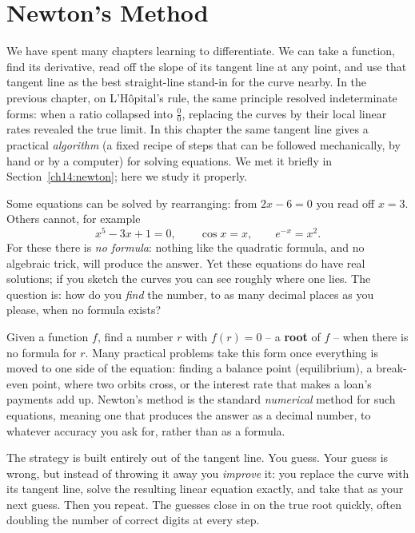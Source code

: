 \chapter{Newton's Method}

We have spent many chapters learning to differentiate. We can take a function,
find its derivative, read off the slope of its tangent line at any point, and use
that tangent line as the best straight-line stand-in for the curve nearby. In the
previous chapter, on L'H\^opital's rule, the same principle resolved
indeterminate forms: when a ratio collapsed into $\tfrac{0}{0}$, replacing the
curves by their local linear rates revealed the true limit. In this chapter the
same tangent line gives a practical \emph{algorithm} (a fixed recipe of steps that
can be followed mechanically, by hand or by a computer) for solving equations. We
met it briefly in Section~\ref{ch14:newton}; here we study it properly.

Some equations can be solved by rearranging: from $2x - 6 = 0$ you read off
$x = 3$. Others cannot, for example
\[
  x^5 - 3x + 1 = 0, \qquad \cos x = x, \qquad e^{-x} = x^2.
\]
For these there is \emph{no formula}: nothing like the quadratic formula, and no
algebraic trick, will produce the answer. Yet these equations do have real
solutions; if you sketch the curves you can see roughly where one lies. The
question is: how do you \emph{find} the number, to as many decimal places as you
please, when no formula exists?

\begin{focusbox}
Given a function $f$, find a number $r$ with $f(r) = 0$ -- a \textbf{root} of $f$ --
when there is no formula for $r$. Many practical problems take this form once
everything is moved to one side of the equation: finding a balance point
(equilibrium), a break-even point, where two orbits cross, or the interest rate
that makes a loan's payments add up. Newton's method is the standard
\emph{numerical} method for such equations, meaning one that produces the answer
as a decimal number, to whatever accuracy you ask for, rather than as a formula.
\end{focusbox}

The strategy is built entirely out of the tangent line. You guess. Your guess is
wrong, but instead of throwing it away you \emph{improve} it: you replace the
curve with its tangent line, solve the resulting linear equation exactly, and take
that as your next guess. Then you repeat. The guesses close in on the true root
quickly, often doubling the number of correct digits at every step.

